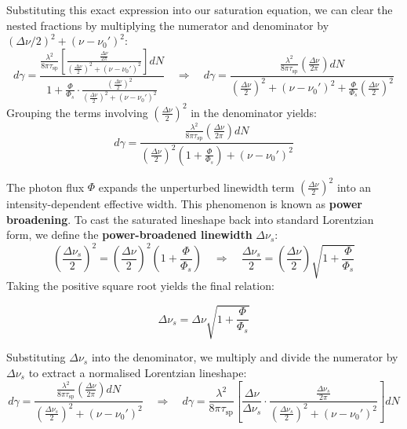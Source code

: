Substituting this exact expression into our saturation equation, we can clear the nested fractions by multiplying the numerator and denominator by $(\Delta\nu/2)^2 + (\nu - \nu_0')^2$:
\begin{equation*}
    d\gamma = \frac{\frac{\lambda^2}{8\pi\tau_{\mathrm{sp}}} \left[ \frac{\frac{\Delta\nu}{2\pi}}{\left(\frac{\Delta\nu}{2}\right)^2 + (\nu - \nu_0')^2} \right] dN}{1 + \frac{\Phi}{\Phi_s} \cdot \frac{\left(\frac{\Delta\nu}{2}\right)^2}{\left(\frac{\Delta\nu}{2}\right)^2 + (\nu - \nu_0')^2}} \quad\Rightarrow\quad d\gamma = \frac{\frac{\lambda^2}{8\pi\tau_{\mathrm{sp}}} \left(\frac{\Delta\nu}{2\pi}\right) dN}{\left(\frac{\Delta\nu}{2}\right)^2 + (\nu - \nu_0')^2 + \frac{\Phi}{\Phi_s}\left(\frac{\Delta\nu}{2}\right)^2}
\end{equation*}
Grouping the terms involving $\left(\frac{\Delta\nu}{2}\right)^2$ in the denominator yields:
\begin{equation*}
    d\gamma = \frac{\frac{\lambda^2}{8\pi\tau_{\mathrm{sp}}} \left(\frac{\Delta\nu}{2\pi}\right) dN}{\left(\frac{\Delta\nu}{2}\right)^2\left(1 + \frac{\Phi}{\Phi_s}\right) + (\nu - \nu_0')^2}
\end{equation*}

The photon flux $\Phi$ expands the unperturbed linewidth term $\left(\frac{\Delta\nu}{2}\right)^2$ into an intensity-dependent effective width. This phenomenon is known as \textbf{power broadening}. To cast the saturated lineshape back into standard Lorentzian form, we define the \textbf{power-broadened linewidth} $\Delta\nu_s$:
\begin{equation*}
    \left(\frac{\Delta\nu_s}{2}\right)^2 = \left(\frac{\Delta\nu}{2}\right)^2\left(1 + \frac{\Phi}{\Phi_s}\right) \quad\Rightarrow\quad \frac{\Delta\nu_s}{2} = \left(\frac{\Delta\nu}{2}\right)\sqrt{1 + \frac{\Phi}{\Phi_s}}
\end{equation*}
Taking the positive square root yields the final relation:
\begin{keyresult}
    \begin{equation}
        \Delta\nu_s = \Delta\nu\sqrt{1 + \frac{\Phi}{\Phi_s}}
    \end{equation}
\end{keyresult}

Substituting $\Delta\nu_s$ into the denominator, we multiply and divide the numerator by $\Delta\nu_s$ to extract a normalised Lorentzian lineshape:
\begin{equation*}
    d\gamma = \frac{\frac{\lambda^2}{8\pi\tau_{\mathrm{sp}}} \left(\frac{\Delta\nu}{2\pi}\right) dN}{\left(\frac{\Delta\nu_s}{2}\right)^2 + (\nu - \nu_0')^2} \quad\Rightarrow\quad d\gamma = \frac{\lambda^2}{8\pi\tau_{\mathrm{sp}}} \left[ \frac{\Delta\nu}{\Delta\nu_s} \cdot \frac{\frac{\Delta\nu_s}{2\pi}}{\left(\frac{\Delta\nu_s}{2}\right)^2 + (\nu - \nu_0')^2} \right] dN
\end{equation*}

